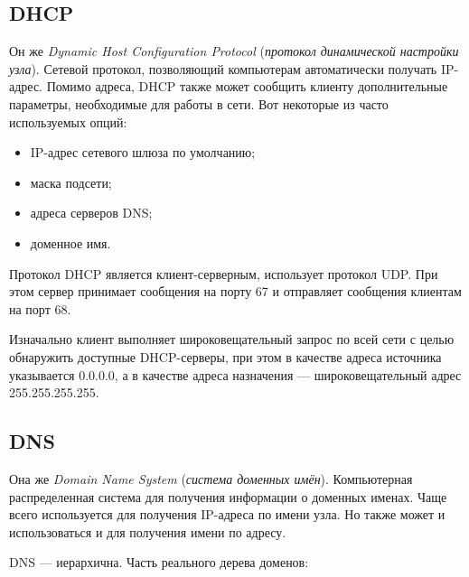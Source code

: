 \subsection{DHCP}
Он же \emph{Dynamic Host Configuration Protocol} (\emph{протокол динамической настройки узла}). Сетевой протокол, позволяющий компьютерам автоматически получать IP-адрес. Помимо адреса, DHCP также может сообщить клиенту дополнительные параметры, необходимые для работы в сети. Вот некоторые из часто используемых опций:
\begin{itemize}
  \item IP-адрес сетевого шлюза по умолчанию;
  \item маска подсети;
  \item адреса серверов DNS;
  \item доменное имя.
\end{itemize}

Протокол DHCP является клиент-серверным, использует протокол UDP. При этом сервер принимает сообщения на порту 67 и отправляет сообщения клиентам на порт 68.

Изначально клиент выполняет широковещательный запрос по всей сети с целью обнаружить доступные DHCP-серверы, при этом в качестве адреса источника указывается 0.0.0.0, а в качестве адреса назначения --- широковещательный адрес 255.255.255.255.

\subsection{DNS}
Она же \emph{Domain Name System} (\emph{система доменных имён}). Компьютерная распределенная система для получения информации о доменных именах. Чаще всего используется для получения IP-адреса по имени узла. Но также может и использоваться и для получения имени по адресу.

DNS — иерархична. Часть реального дерева доменов:
\begin{center}
\end{center}

